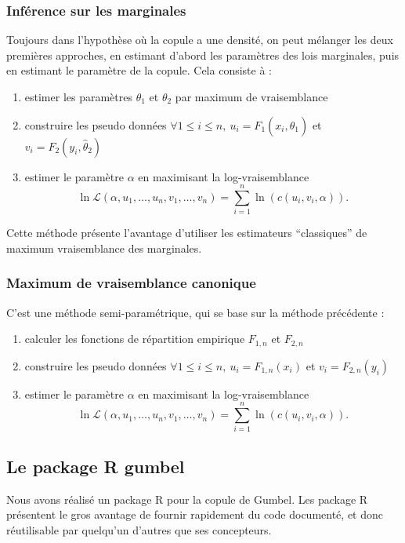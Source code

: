 \documentclass[11pt]{article}
\newcommand{\pkg}{\textbf}
\newcommand{\soft}{\textsf}
\begin{document}
\subsubsection{Inf\'erence sur les marginales}
Toujours dans l'hypoth\`ese o\`u la copule a une densit\'e, on peut m\'elanger les deux premi\`eres approches, en estimant d'abord les param\`etres
des lois marginales, puis en estimant le param\`etre de la copule. Cela consiste \`a :
\begin{enumerate}
\item estimer les param\`etres $\theta_1$ et $\theta_2$ par maximum de vraisemblance
\item construire les pseudo donn\'ees $\forall 1\leq i \leq n, ~u_i = F_1(x_i, \hat \theta_1)$ et $v_i = F_2(y_i, \hat \theta_2)$
\item estimer le param\`etre $\alpha$ en maximisant la log-vraisemblance 
$$\ln \mathcal L(\alpha, u_1,\dots, u_n, v_1,\dots, v_n) = \sum_{i=1}^n \ln\left( c \left( u_i, v_i,\alpha \right)\right).$$
\end{enumerate}
Cette m\'ethode pr\'esente l'avantage d'utiliser les estimateurs ``classiques'' de maximum vraisemblance des marginales.

\subsubsection{Maximum de vraisemblance canonique}
C'est une m\'ethode semi-param\'etrique, qui se base sur la m\'ethode pr\'ec\'edente :
\begin{enumerate}
\item calculer les fonctions de r\'epartition empirique $F_{1,n}$ et $F_{2,n}$
\item construire les pseudo donn\'ees $\forall 1\leq i \leq n, ~u_i = F_{1,n}(x_i)$ et $v_i = F_{2,n}(y_i)$
\item estimer le param\`etre $\alpha$ en maximisant la log-vraisemblance 
$$\ln \mathcal L(\alpha, u_1,\dots, u_n, v_1,\dots, v_n) = \sum_{i=1}^n \ln\left( c \left( u_i, v_i,\alpha \right)\right).$$
\end{enumerate}

\subsection{Le package \soft{R} \pkg{gumbel}}
Nous avons r\'ealis\'e un package \soft{R} pour la copule de Gumbel. Les package \soft{R} pr\'esentent le gros avantage
de fournir rapidement du code document\'e, et donc r\'eutilisable par quelqu'un d'autres que ses concepteurs.
\end{document}

